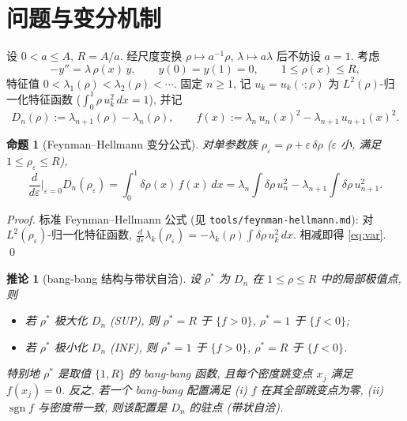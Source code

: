 \documentclass[UTF8]{ctexart}
\newtheorem{corollary}[theorem]{推论}
\newtheorem{proposition}[theorem]{命题}
\begin{document}
\tableofcontents

\section{问题与变分机制}\label{sec:mech}

设 $0 < a \leq A$, $R = A/a$. 经尺度变换 $\rho \mapsto a^{-1}\rho$,
$\lambda \mapsto a\lambda$ 后不妨设 $a = 1$. 考虑
\begin{equation}
	-y'' = \lambda\,\rho(x)\,y, \qquad y(0) = y(1) = 0,
	\qquad 1 \leq \rho(x) \leq R,
\end{equation}
特征值 $0 < \lambda_1(\rho) < \lambda_2(\rho) < \cdots$. 固定 $n \geq 1$,
记 $u_k = u_k(\cdot; \rho)$ 为 $L^2(\rho)$-归一化特征函数
($\int_0^1 \rho\, u_k^2\, dx = 1$), 并记
\[
	D_n(\rho) := \lambda_{n+1}(\rho) - \lambda_n(\rho),
	\qquad
	f(x) := \lambda_n\, u_n(x)^2 - \lambda_{n+1}\, u_{n+1}(x)^2.
\]

\begin{proposition}[Feynman--Hellmann 变分公式]\label{prop:fh}
	对单参数族 $\rho_\varepsilon = \rho + \varepsilon\,\delta\rho$ ($\varepsilon$
	小, 满足 $1 \leq \rho_\varepsilon \leq R$),
	\begin{equation}\label{eq:var}
		\frac{d}{d\varepsilon}\Big|_{\varepsilon=0} D_n(\rho_\varepsilon)
		= \int_0^1 \delta\rho(x)\, f(x)\, dx
		= \lambda_n\!\int\!\delta\rho\, u_n^2
		  - \lambda_{n+1}\!\int\!\delta\rho\, u_{n+1}^2.
	\end{equation}
\end{proposition}

\begin{proof}
	标准 Feynman--Hellmann 公式 (见 \texttt{tools/feynman-hellmann.md}):
	对 $L^2(\rho_\varepsilon)$-归一化特征函数,
	$\frac{d}{d\varepsilon}\lambda_k(\rho_\varepsilon) =
	-\lambda_k(\rho)\int \delta\rho\, u_k^2\, dx$. 相减即得
	\eqref{eq:var}. \qed
\end{proof}

\begin{corollary}[bang-bang 结构与带状自洽]\label{cor:bang}
	设 $\rho^*$ 为 $D_n$ 在 $1 \leq \rho \leq R$ 中的局部极值点, 则
	\begin{itemize}
		\item 若 $\rho^*$ 极大化 $D_n$ (SUP), 则
			$\rho^* = R$ 于 $\{f > 0\}$, $\rho^* = 1$ 于 $\{f < 0\}$;
		\item 若 $\rho^*$ 极小化 $D_n$ (INF), 则
			$\rho^* = 1$ 于 $\{f > 0\}$, $\rho^* = R$ 于 $\{f < 0\}$.
	\end{itemize}
	特别地 $\rho^*$ 是取值 $\{1, R\}$ 的 bang-bang 函数, 且每个密度跳变点
	$x_j$ 满足 $f(x_j) = 0$. 反之, 若一个 bang-bang 配置满足
	(i) $f$ 在其全部跳变点为零, (ii) $\operatorname{sgn} f$ 与密度带一致,
	则该配置是 $D_n$ 的驻点 (带状自洽).
\end{corollary}
\end{document}

